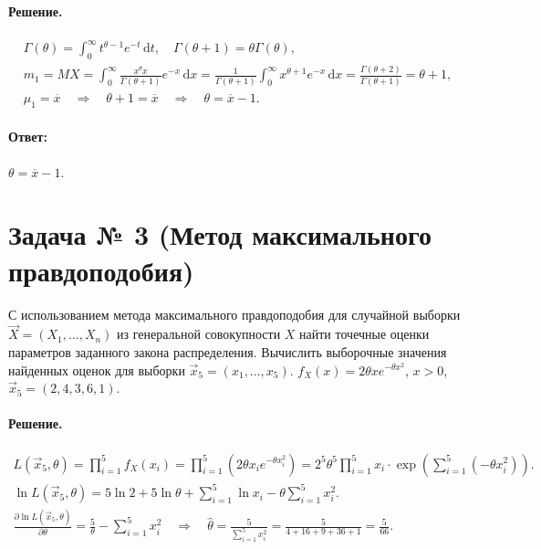 \documentclass[a4paper,oneside,12pt]{extreport}
\begin{document}
\paragraph{Решение.}
\begin{gather*}
	\Gamma(\theta) = \int_0^\infty t^{\theta-1}e^{-t}\,\mathrm dt, \quad \Gamma(\theta + 1) = \theta\Gamma(\theta), \\
	m_1 = MX = \int_0^\infty \frac{x^\theta x}{\Gamma(\theta + 1)}e^{-x} \, \mathrm dx = \frac{1}{\Gamma(\theta + 1)}\int_0^\infty x^{\theta+1}e^{-x}\,\mathrm dx = \frac{\Gamma(\theta + 2)}{\Gamma(\theta + 1)} = \theta + 1, \\
	\hat\mu_1 = \overline x \quad\Rightarrow\quad \theta + 1 = \overline x \quad\Rightarrow\quad \theta = \overline x - 1.
\end{gather*}

\paragraph{Ответ:} $\theta = \overline x - 1$.


\pagebreak
\section*{Задача № 3 (Метод максимального правдоподобия)}

С использованием метода максимального правдоподобия для случайной выборки $\vec X = (X_1, \ldots, X_n)$ из генеральной совокупности $X$ найти точечные оценки параметров заданного закона распределения.
Вычислить выборочные значения найденных оценок для выборки $\vec x_5 = (x_1, \ldots, x_5)$.
$f_X(x) = 2\theta xe^{-\theta x^2}$, $x > 0$, $\vec x_5 = (2, 4, 3, 6, 1)$.

\paragraph{Решение.}
\begin{gather*}
	L(\vec x_5, \theta) = \prod_{i=1}^5 f_X(x_i) = \prod_{i=1}^5 \left(2\theta x_ie^{-\theta x_i^2}\right) = 2^5\theta^5 \prod_{i=1}^5 x_i \cdot \exp\left(\sum_{i=1}^5(-\theta x_i^2)\right). \\
	\ln L(\vec x_5, \theta) = 5\ln2 + 5\ln\theta + \sum_{i=1}^5\ln x_i - \theta\sum_{i=1}^5 x_i^2. \\
	\frac{\partial \ln L(\vec x_5, \theta)}{\partial\theta} = \frac 5\theta - \sum_{i=1}^5 x_i^2 \quad\Rightarrow\quad \hat\theta = \frac{5}{\sum_{i=1}^5 x_i^2} = \frac 5{4 + 16 + 9 + 36 + 1} = \frac 5{66}.
\end{gather*}
\end{document}
